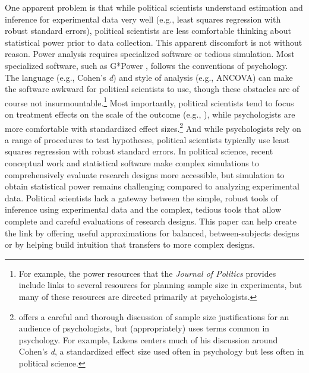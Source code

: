 \documentclass[12pt]{article}
\begin{document}
One apparent problem is that while political scientists understand estimation and inference for experimental data very well (e.g., least squares regression with robust standard errors), political scientists are less comfortable thinking about statistical power prior to data collection.
This apparent discomfort is not without reason.
Power analysis requires specialized software or tedious simulation.
Most specialized software, such as G*Power \citep{Faul2007, Faul2009}, follows the conventions of psychology.
The language (e.g., Cohen's \emph{d}) and style of analysis (e.g., ANCOVA) can make the software awkward for political scientists to use, though these obstacles are of course not insurmountable.\footnote{
  For example, the power resources that the \emph{Journal of Politics} provides include links to several resources for planning sample size in experiments, but many of these resources are directed primarily at psychologists.
  }
Most importantly, political scientists tend to focus on treatment effects on the scale of the outcome (e.g., \citealt{King2000}), while psychologists are more comfortable with standardized effect sizes.\footnote{
  \citet{Lakens2022} offers a careful and thorough discussion of sample size justifications for an audience of psychologists, but (appropriately) uses terms common in psychology.
  For example, Lakens centers much of his discussion around Cohen's \emph{d}, a standardized effect size used often in psychology but less often in political science.
  }
And while psychologists rely on a range of procedures to test hypotheses, political scientists typically use least squares regression with robust standard errors.
In political science, recent conceptual work and statistical software \citep{Blair2019, Blair2023} make complex simulations to comprehensively evaluate research designs more accessible, but simulation to obtain statistical power remains challenging compared to analyzing experimental data.
Political scientists lack a gateway between the simple, robust tools of inference using experimental data and the complex, tedious tools that allow complete and careful evaluations of research designs.
This paper can help create the link by offering useful approximations for balanced, between-subjects designs or by helping build intuition that transfers to more complex designs.
\end{document}
